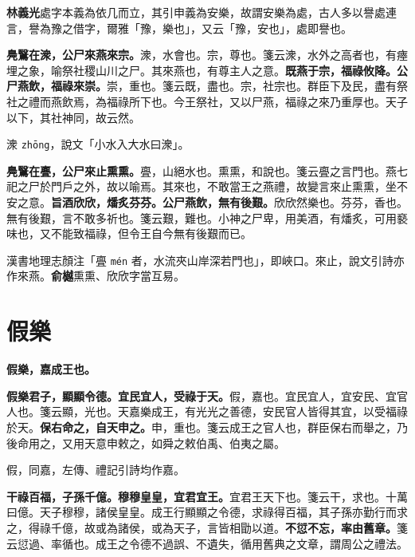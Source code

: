 \begin{quoting}\textbf{林義光}處字本義為依几而立，其引申義為安樂，故謂安樂為處，古人多以譽處連言，譽為豫之借字，爾雅「豫，樂也」，又云「豫，安也」，處即譽也。\end{quoting}

\textbf{鳧鷖在潨，公尸來燕來宗。}{\footnotesize 潨，水會也。宗，尊也。箋云潨，水外之高者也，有瘞埋之象，喻祭社稷山川之尸。其來燕也，有尊主人之意。}\textbf{既燕于宗，福祿攸降。公尸燕飲，福祿來崇。}{\footnotesize 崇，重也。箋云既，盡也。宗，社宗也。群臣下及民，盡有祭社之禮而燕飲焉，為福祿所下也。今王祭社，又以尸燕，福祿之來乃重厚也。天子以下，其社神同，故云然。}

\begin{quoting}潨 \texttt{zhōng}，說文「小水入大水曰潨」。\end{quoting}

\textbf{鳧鷖在亹，公尸來止熏熏。}{\footnotesize 亹，山絕水也。熏熏，和說也。箋云亹之言門也。燕七祀之尸於門戶之外，故以喻焉。其來也，不敢當王之燕禮，故變言來止熏熏，坐不安之意。}\textbf{旨酒欣欣，燔炙芬芬。公尸燕飲，無有後艱。}{\footnotesize 欣欣然樂也。芬芬，香也。無有後艱，言不敢多祈也。箋云艱，難也。小神之尸卑，用美酒，有燔炙，可用褻味也，又不能致福祿，但令王自今無有後艱而已。}

\begin{quoting}漢書地理志顏注「亹 \texttt{mén} 者，水流夾山岸深若門也」，即峽口。來止，說文引詩亦作來燕。\textbf{俞樾}熏熏、欣欣字當互易。\end{quoting}

\section{假樂}


\textbf{假樂，嘉成王也。}

\textbf{假樂君子，顯顯令德。宜民宜人，受祿于天。}{\footnotesize 假，嘉也。宜民宜人，宜安民、宜官人也。箋云顯，光也。天嘉樂成王，有光光之善德，安民官人皆得其宜，以受福祿於天。}\textbf{保右命之，自天申之。}{\footnotesize 申，重也。箋云成王之官人也，群臣保右而舉之，乃後命用之，又用天意申敕之，如舜之敕伯禹、伯夷之屬。}

\begin{quoting}假，同嘉，左傳、禮記引詩均作嘉。\end{quoting}

\textbf{干祿百福，子孫千億。穆穆皇皇，宜君宜王。}{\footnotesize 宜君王天下也。箋云干，求也。十萬曰億。天子穆穆，諸侯皇皇。成王行顯顯之令德，求祿得百福，其子孫亦勤行而求之，得祿千億，故或為諸侯，或為天子，言皆相勖以道。}\textbf{不愆不忘，率由舊章。}{\footnotesize 箋云愆過、率循也。成王之令德不過誤、不遺失，循用舊典之文章，謂周公之禮法。}

